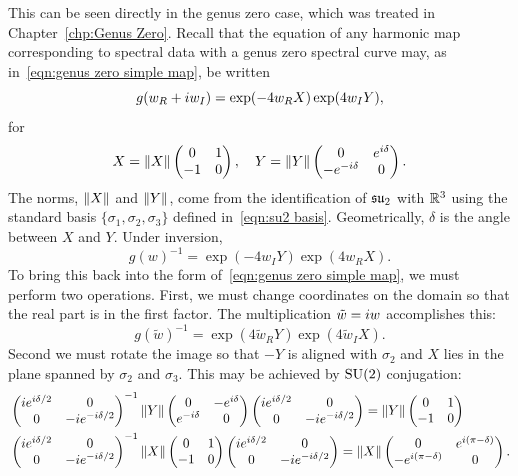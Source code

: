 \documentclass{article}
\begin{document}
This can be seen directly in the genus zero case, which was treated in Chapter~\ref{chp:Genus Zero}. Recall that the equation of any harmonic map corresponding to spectral data with a genus zero spectral curve may, as in~\eqref{eqn:genus zero simple map}, be written
\[
g(w_R + i w_I) = \exp (-4w_R X) \exp (4w_I Y),
\]
for
\[
X = {\left\Vert X\right\Vert}\begin{pmatrix}
0 & 1 \\
-1 & 0
\end{pmatrix}, \quad
Y = {\left\Vert Y\right\Vert}\begin{pmatrix}
0 & e^{i \delta} \\
-e^{-i \delta} & 0
\end{pmatrix}.
\]
The norms, ${\left\Vert X\right\Vert}$ and ${\left\Vert Y\right\Vert}$, come from the identification of $\mathfrak{su}_2$ with $\mathbb{R}^3$ using the standard basis $\{\sigma_1,\sigma_2,\sigma_3\}$ defined in~\eqref{eqn:su2 basis}. Geometrically, $\delta$ is the angle between $X$ and $Y$. Under inversion,
\[
g(w)^{-1} = \exp (-4w_I Y) \exp (4w_R X).
\]
To bring this back into the form of~\eqref{eqn:genus zero simple map}, we must perform two operations. First, we must change coordinates on the domain so that the real part is in the first factor. The multiplication $\tilde{w} = i w$ accomplishes this:
\[
g(\tilde{w})^{-1} = \exp (4\tilde{w}_R Y) \exp (4\tilde{w}_I X).
\]
Second we must rotate the image so that $-Y$ is aligned with $\sigma_2$ and $X$ lies in the plane spanned by $\sigma_2$ and $\sigma_3$. This may be achieved by $\mathrm{SU}(2)$ conjugation:
\begin{align*}
&\begin{pmatrix}
i e^{i \delta/2} & 0 \\
0 & -i e^{-i \delta/2}
\end{pmatrix}^{-1}
{\left\Vert Y\right\Vert}\begin{pmatrix}
0 & -e^{i \delta} \\
e^{-i \delta} & 0
\end{pmatrix}
\begin{pmatrix}
i e^{i \delta/2} & 0 \\
0 & -i e^{-i \delta/2}
\end{pmatrix}
=
{\left\Vert Y\right\Vert}\begin{pmatrix}
0 & 1 \\
-1 & 0
\end{pmatrix}
\\
&\begin{pmatrix}
i e^{i \delta/2} & 0 \\
0 & -i e^{-i \delta/2}
\end{pmatrix}^{-1}
{\left\Vert X\right\Vert}\begin{pmatrix}
0 & 1 \\
-1 & 0
\end{pmatrix}
\begin{pmatrix}
i e^{i \delta/2} & 0 \\
0 & -i e^{-i \delta/2}
\end{pmatrix}
=
{\left\Vert X\right\Vert}\begin{pmatrix}
0 & e^{i(\pi- \delta)} \\
-e^{i (\pi-\delta)} & 0
\end{pmatrix}.
\end{align*}
\end{document}
